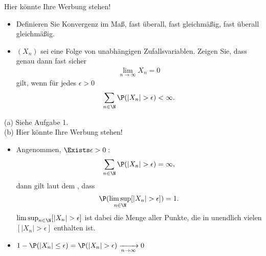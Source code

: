 \begin{exercise}

Hier könnte Ihre Werbung stehen!

\begin{itemize}
  \item[(a)] Definieren Sie Konvergenz im Maß, fast überall, fast gleichmäßig, fast überall gleichmäßig.
  \item[(b)] $(X_n)$ sei eine Folge von unabhängigen Zufallsvariablen. Zeigen Sie, dass genau dann fast sicher
  \begin{align*}
    \lim_{n \to \infty} X_n = 0
  \end{align*}
  gilt, wenn für jedes $\epsilon > 0$
  \begin{align*}
    \sum_{n \in \N} \P(|X_n| > \epsilon) < \infty.
  \end{align*}
\end{itemize}

\end{exercise}


\begin{solution}

(a) Siehe Aufgabe 1. \\

(b) Hier könnte Ihre Werbung stehen!

\begin{itemize}

  \item[\Quote{$\Rightarrow$}:] Angenommen, $\Exists \epsilon > 0:$
  \begin{align*}
    \sum_{n \in \N} \P(|X_n| > \epsilon) = \infty,
  \end{align*}
  dann gilt laut dem , dass
  \begin{align*}
    \P(\limsup_{n \in \N} [|X_n| > \epsilon]) = 1.
  \end{align*}
  $\limsup_{n \in \N} [|X_n| > \epsilon]$ ist dabei die Menge aller Punkte, die in unendlich vielen $[|X_n| > \epsilon]$ enthalten ist.

  \item[\Quote{$\Leftarrow$}:]
  $1 - \P(|X_n| \leq \epsilon)
  =
  \P(|X_n| > \epsilon)
  \xrightarrow[n \to \infty]{} 0$

\end{itemize}

\end{solution}
